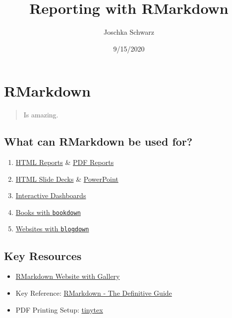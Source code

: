 \documentclass[
]{article}
\title{Reporting with RMarkdown}
\author{Joschka Schwarz}
\date{9/15/2020}
\providecommand{\tightlist}{%
  \setlength{\itemsep}{0pt}\setlength{\parskip}{0pt}}
\begin{document}
\maketitle

{
\setcounter{tocdepth}{2}
\tableofcontents
}
\hypertarget{rmarkdown}{%
\section{RMarkdown}\label{rmarkdown}}

\begin{quote}
Is amazing.
\end{quote}

\hypertarget{what-can-rmarkdown-be-used-for}{%
\subsection{What can RMarkdown be used
for?}\label{what-can-rmarkdown-be-used-for}}

\begin{enumerate}
\def\labelenumi{\arabic{enumi}.}
\tightlist
\item
  \href{https://bookdown.org/yihui/rmarkdown/html-document.html}{HTML
  Reports} \&
  \href{https://bookdown.org/yihui/rmarkdown/pdf-document.html}{PDF
  Reports}
\item
  \href{https://bookdown.org/yihui/rmarkdown/ioslides-presentation.html}{HTML
  Slide Decks} \&
  \href{https://bookdown.org/yihui/rmarkdown/powerpoint-presentation.html}{PowerPoint}
\item
  \href{https://rmarkdown.rstudio.com/flexdashboard/index.html}{Interactive
  Dashboards}
\item
  \href{https://bookdown.org/}{Books with \texttt{bookdown}}
\item
  \href{https://bookdown.org/yihui/blogdown/}{Websites with
  \texttt{blogdown}}
\end{enumerate}

\hypertarget{key-resources}{%
\subsection{Key Resources}\label{key-resources}}

\begin{itemize}
\item
  \href{https://rmarkdown.rstudio.com/index.html}{RMarkdown Website with
  Gallery}
\item
  Key Reference: \href{https://bookdown.org/yihui/rmarkdown/}{RMarkdown
  - The Definitive Guide}
\item
  PDF Printing Setup: \href{https://yihui.name/tinytex/}{tinytex}
\end{itemize}
\end{document}

